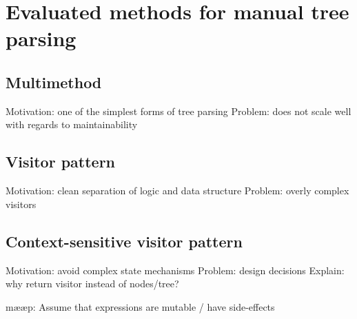 \section{Evaluated methods for manual tree parsing}
\label{sect:method:evaluated_methods}

\subsection{Multimethod}
\label{sect:method:evaluated_methods}
Motivation: one of the simplest forms of tree parsing
Problem: does not scale well with regards to maintainability

\subsection{Visitor pattern}
\label{sect:method:evaluated_methods}
Motivation: clean separation of logic and data structure 
Problem: overly complex visitors

\subsection{Context-sensitive visitor pattern}
\label{sect:method:evaluated_methods}
Motivation: avoid complex state mechanisms
Problem: design decisions
Explain: why return visitor instead of nodes/tree?

mææp: Assume that expressions are mutable / have side-effects
